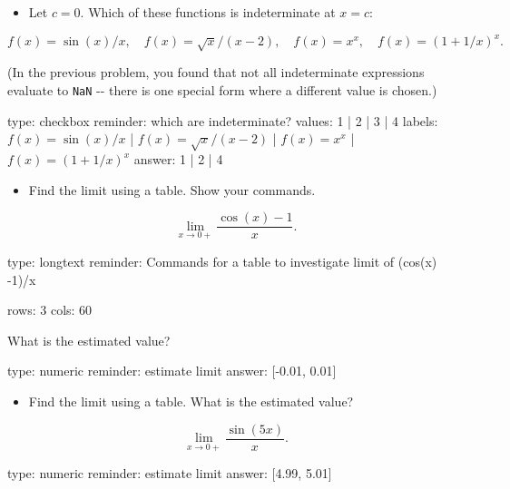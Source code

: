 \documentclass[12pt]{article}
\begin{document}
\begin{itemize}
\itemsep1pt\parskip0pt
\item
  Let $c=0$. Which of these functions is indeterminate at $x=c$:
\end{itemize}

\[
f(x) = \sin(x)/x, \quad
f(x) = \sqrt{x}/(x-2), \quad
f(x) = x^x, \quad
f(x) = (1 + 1/x)^x.
\]

(In the previous problem, you found that not all indeterminate
expressions evaluate to \texttt{NaN} -{}- there is one special form
where a different value is chosen.)

\begin{answer}
type: checkbox
reminder: which are indeterminate?
values: 1 | 2 | 3 | 4
labels: \( f(x) = \sin(x)/x \) | \( f(x) = \sqrt{x}/(x-2) \) | \( f(x) = x^x \) | \( f(x) = (1 + 1/x)^x \)
answer: 1 | 2 | 4
\end{answer}

\begin{itemize}
\itemsep1pt\parskip0pt
\item
  Find the limit using a table. Show your commands.
\end{itemize}

\[
\lim_{x \rightarrow 0+} \frac{\cos(x) - 1}{x}.
\]

\begin{answer}
type: longtext
reminder: Commands for a table to investigate limit of (cos(x) -1)/x

rows: 3
cols: 60
\end{answer}

What is the estimated value?

\begin{answer}
    type: numeric
    reminder: estimate limit
    answer: [-0.01, 0.01]

\end{answer}

\begin{itemize}
\itemsep1pt\parskip0pt
\item
  Find the limit using a table. What is the estimated value?
\end{itemize}

\[
\lim_{x \rightarrow 0+} \frac{\sin(5x)}{x}.
\]

\begin{answer}
    type: numeric
    reminder: estimate limit
    answer: [4.99, 5.01]

\end{answer}
\end{document}
